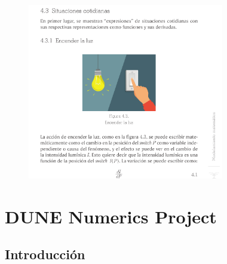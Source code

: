 \begin{frame}
	\frametitle{\secname}

	\begin{figure}[ht!]
		\centering
		\includegraphics[height=7.7cm]{vida_cotidiana}
	\end{figure}

\end{frame}

\section{DUNE Numerics Project}
\subsection{Introducción}

